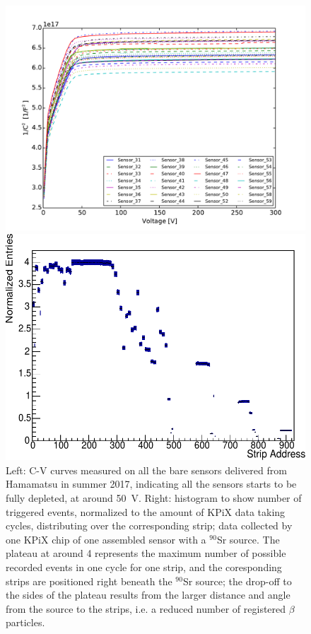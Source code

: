\documentclass[conference]{IEEEtran}
\begin{document}
\begin{figure}[!ht]%
\centering
\begin{minipage}{.5\textwidth}
  \centering
  \includegraphics[width=1.08\linewidth]{pics/All_sensors_CV.pdf}
\end{minipage}%
\begin{minipage}{.5\textwidth}
  \includegraphics[width=\linewidth]{pics/S58_K2_2018_05_07_16_49_42_strip_entries_modded}
\end{minipage}%
\caption{
Left: C-V curves measured on all the bare sensors delivered from Hamamatsu in summer 2017, indicating all the sensors starts to be fully depleted, at around \SI{50}{\volt}.
Right: histogram to show number of triggered events, normalized to the amount of KPiX data taking cycles, distributing over the corresponding strip;
data collected by one KPiX chip of one assembled sensor with a $^{90}$Sr source.
The plateau at around 4 represents the maximum number of possible recorded events in one cycle for one strip, and the coresponding strips are positioned right beneath the $^{90}$Sr source;
the drop-off to the sides of the plateau results from the larger distance and angle from the source to the strips, i.e. a reduced number of registered $\beta$ particles.
}%
\label{fig:2figs}%
\end{figure}
\end{document}
